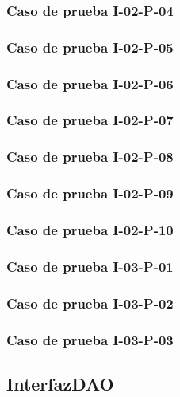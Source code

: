 \documentclass[10pt,a4paper]{article}
\begin{document}
			\subsubsection{Caso de prueba I-02-P-04}

			\subsubsection{Caso de prueba I-02-P-05}

			\subsubsection{Caso de prueba I-02-P-06}

			\subsubsection{Caso de prueba I-02-P-07}

			\subsubsection{Caso de prueba I-02-P-08}

			\subsubsection{Caso de prueba I-02-P-09}

			\subsubsection{Caso de prueba I-02-P-10}

			\subsubsection{Caso de prueba I-03-P-01}

			\subsubsection{Caso de prueba I-03-P-02}

			\subsubsection{Caso de prueba I-03-P-03}

	\subsection{InterfazDAO}
\end{document}
